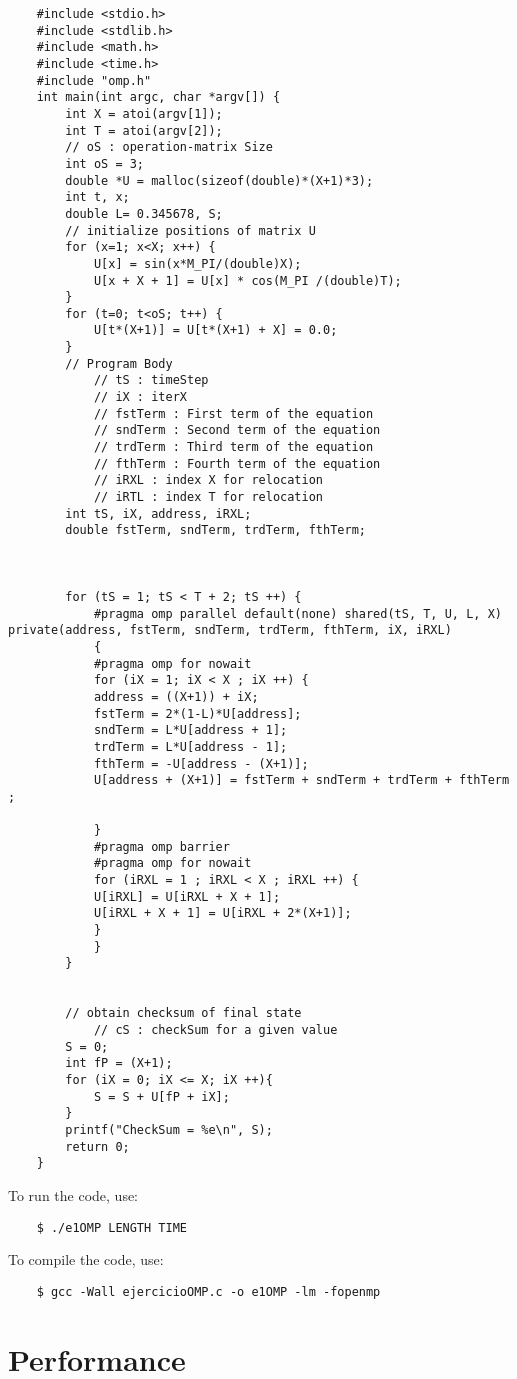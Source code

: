 \documentclass{article}
\begin{document}
\begin{verbatim}
	#include <stdio.h>
	#include <stdlib.h>
	#include <math.h>
	#include <time.h>
	#include "omp.h"
	int main(int argc, char *argv[]) {
		int X = atoi(argv[1]);
		int T = atoi(argv[2]);
		// oS : operation-matrix Size
		int oS = 3;
		double *U = malloc(sizeof(double)*(X+1)*3);
		int t, x;
		double L= 0.345678, S;
		// initialize positions of matrix U
		for (x=1; x<X; x++) {
			U[x] = sin(x*M_PI/(double)X);
			U[x + X + 1] = U[x] * cos(M_PI /(double)T);
		}
		for (t=0; t<oS; t++) {
			U[t*(X+1)] = U[t*(X+1) + X] = 0.0;
		}
		// Program Body
			// tS : timeStep
			// iX : iterX
			// fstTerm : First term of the equation
			// sndTerm : Second term of the equation
			// trdTerm : Third term of the equation
			// fthTerm : Fourth term of the equation
			// iRXL : index X for relocation
			// iRTL : index T for relocation
		int tS, iX, address, iRXL;
		double fstTerm, sndTerm, trdTerm, fthTerm;



		for (tS = 1; tS < T + 2; tS ++) {
			#pragma omp parallel default(none) shared(tS, T, U, L, X) private(address, fstTerm, sndTerm, trdTerm, fthTerm, iX, iRXL)
			{
			#pragma omp for nowait
			for (iX = 1; iX < X ; iX ++) {
			address = ((X+1)) + iX;
			fstTerm = 2*(1-L)*U[address];
			sndTerm = L*U[address + 1];
			trdTerm = L*U[address - 1];
			fthTerm = -U[address - (X+1)];
			U[address + (X+1)] = fstTerm + sndTerm + trdTerm + fthTerm ;

			}
			#pragma omp barrier
			#pragma omp for nowait
			for (iRXL = 1 ; iRXL < X ; iRXL ++) {
			U[iRXL] = U[iRXL + X + 1];
			U[iRXL + X + 1] = U[iRXL + 2*(X+1)];
			}
			}
		}


		// obtain checksum of final state
			// cS : checkSum for a given value
		S = 0;
		int fP = (X+1);
		for (iX = 0; iX <= X; iX ++){
			S = S + U[fP + iX];
		}
		printf("CheckSum = %e\n", S);
		return 0;
	}

\end{verbatim}

	To run the code, use:

\begin{verbatim}
	$ ./e1OMP LENGTH TIME
\end{verbatim}
	To compile the code, use:
\begin{verbatim}
	$ gcc -Wall ejercicioOMP.c -o e1OMP -lm -fopenmp
\end{verbatim}


\section {Performance}
\end{document}
